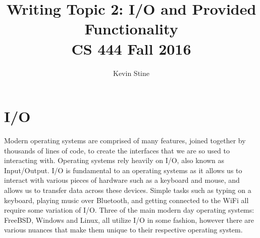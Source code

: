 \documentclass[letterpaper,10pt,draftclsnofoot,onecolumn,titlepage]{IEEEtran}
\def\name{Kevin Stine}
\begin{document}
	\title{\huge Writing Topic 2: I/O and Provided Functionality\\CS 444 Fall 2016}
	\author{\large \name}
	\maketitle
	\newpage
	\section*{I/O}
		Modern operating systems are comprised of many features, joined together by thousands of lines of code, to create the interfaces that we are so used to interacting with.
		Operating systems rely heavily on I/O, also known as Input/Output.
		I/O is fundamental to an operating systems as it allows us to interact with various pieces of hardware such as a keyboard and mouse, and allows us to transfer data across these devices.
		Simple tasks such as typing on a keyboard, playing music over Bluetooth, and getting connected to the WiFi all require some variation of I/O.
		Three of the main modern day operating systems: FreeBSD, Windows and Linux, all utilize I/O in some fashion, however there are various nuances that make them unique to their respective operating system.
\end{document}
